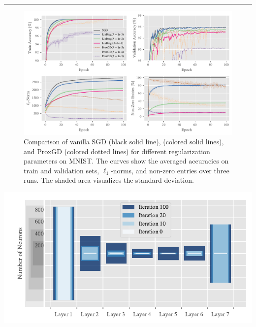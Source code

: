 \newlength\bottomstripheight%
\setlength{\bottomstripheight}{.25\textheight}%
%
\begin{minipage}[t]{\textwidth}%
\vskip0pt%
\textcolor{BaseColor}{%
\rule{\textwidth}{.2mm}%
}\hfill%
%
%
\begin{minipage}[b][\bottomstripheight][b]{.48\textwidth}%
%
%
\small%
\begin{figure}
\centering
\includegraphics[width=.7\textwidth]{atelier/SGDvsBreg.pdf}
\caption{Comparison of vanilla SGD (black solid line), \LinBreg{} (colored solid lines), and ProxGD (colored dotted lines) for different regularization parameters on MNIST.
The curves show the averaged accuracies on train and validation sets, $\ell_1$-norms, and non-zero entries over three runs. The shaded area visualizes the standard deviation.}
\end{figure}%
\vfill%
\vphantom{.}
\end{minipage}%
%
\hfill%
%
%
%
\hfill%
%
%
%
%
%
%
%
\noindent\begin{minipage}[b][\bottomstripheight][b]{.48\textwidth}%
%
%
\small%


\includegraphics[width=\textwidth]{atelier/Encoder_3.pdf}
\vfill%
\vphantom{.}
\end{minipage}%
\end{minipage}%
%

